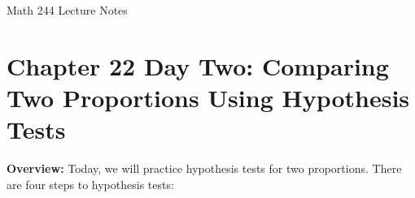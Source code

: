 \documentclass[12pt]{amsart}
\date{}
\theoremstyle{definition}
\begin{document}
\newcommand{\ph}{\phantom}
\newcommand{\ds}{\displaystyle}

\renewcommand{\emph}{\textbf}
\onehalfspace


\fancyhf{}   %
\renewcommand{\headrulewidth}{0.4pt} %
\fancyfootoffset[LE,LO]{0in}        %
\renewcommand{\footrulewidth}{0.4pt} %




\begin{center}

	\larger[3]	Math 244 Lecture Notes \smaller[3]		\\[22pt]

\end{center}

\section*{Chapter 22 Day Two: Comparing Two Proportions Using Hypothesis Tests}




 \noindent \textbf{Overview:} Today, we will practice hypothesis tests for two proportions. There are four steps to hypothesis tests:
\end{document}
